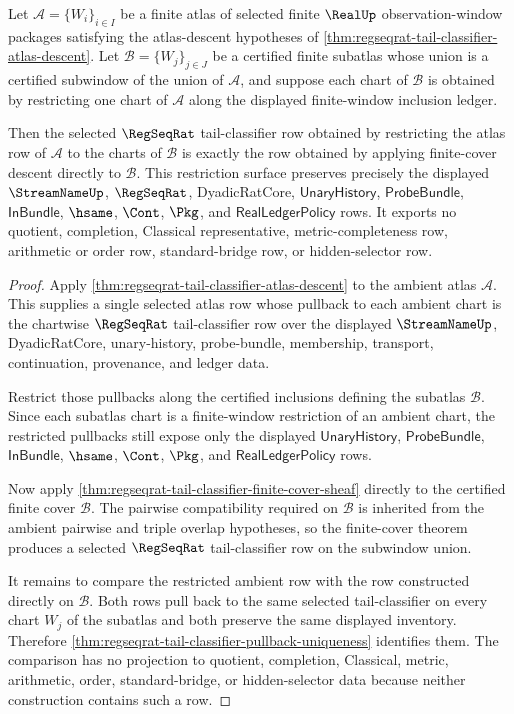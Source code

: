 \begin{theorem}
\label{thm:regseqrat-tail-classifier-subatlas-restriction-exactness}
Let $\mathcal{A}=\{W_i\}_{i\in I}$ be a finite atlas of selected finite
$\RealUp$ observation-window packages satisfying the atlas-descent hypotheses
of \autoref{thm:regseqrat-tail-classifier-atlas-descent}. Let
$\mathcal{B}=\{W_j\}_{j\in J}$ be a certified finite subatlas whose union is a
certified subwindow of the union of $\mathcal{A}$, and suppose each chart of
$\mathcal{B}$ is obtained by restricting one chart of $\mathcal{A}$ along the
displayed finite-window inclusion ledger.

Then the selected $\RegSeqRat$ tail-classifier row obtained by restricting the
atlas row of $\mathcal{A}$ to the charts of $\mathcal{B}$ is exactly the row
obtained by applying finite-cover descent directly to $\mathcal{B}$. This
restriction surface preserves precisely the displayed $\StreamNameUp$,
$\RegSeqRat$, DyadicRatCore, $\mathsf{UnaryHistory}$,
$\mathsf{ProbeBundle}$, $\mathsf{InBundle}$, $\hsame$, $\Cont$, $\Pkg$, and
$\mathsf{RealLedgerPolicy}$ rows. It exports no quotient, completion,
Classical representative, metric-completeness row, arithmetic or order row,
standard-bridge row, or hidden-selector row.
\end{theorem}
\begin{proof}
Apply \autoref{thm:regseqrat-tail-classifier-atlas-descent} to the ambient
atlas $\mathcal{A}$. This supplies a single selected atlas row whose pullback
to each ambient chart is the chartwise $\RegSeqRat$ tail-classifier row over
the displayed $\StreamNameUp$, DyadicRatCore, unary-history, probe-bundle,
membership, transport, continuation, provenance, and ledger data.

Restrict those pullbacks along the certified inclusions defining the subatlas
$\mathcal{B}$. Since each subatlas chart is a finite-window restriction of an
ambient chart, the restricted pullbacks still expose only the displayed
$\mathsf{UnaryHistory}$, $\mathsf{ProbeBundle}$, $\mathsf{InBundle}$,
$\hsame$, $\Cont$, $\Pkg$, and $\mathsf{RealLedgerPolicy}$ rows.

Now apply \autoref{thm:regseqrat-tail-classifier-finite-cover-sheaf} directly
to the certified finite cover $\mathcal{B}$. The pairwise compatibility
required on $\mathcal{B}$ is inherited from the ambient pairwise and triple
overlap hypotheses, so the finite-cover theorem produces a selected
$\RegSeqRat$ tail-classifier row on the subwindow union.

It remains to compare the restricted ambient row with the row constructed
directly on $\mathcal{B}$. Both rows pull back to the same selected
tail-classifier on every chart $W_j$ of the subatlas and both preserve the
same displayed inventory. Therefore
\autoref{thm:regseqrat-tail-classifier-pullback-uniqueness} identifies them.
The comparison has no projection to quotient, completion, Classical, metric,
arithmetic, order, standard-bridge, or hidden-selector data because neither
construction contains such a row.
\end{proof}

